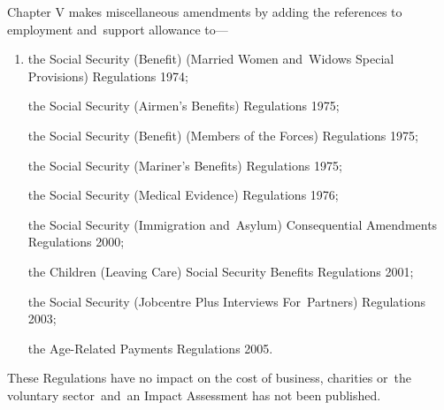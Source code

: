\documentclass[12pt,a4paper]{article}
\begin{document}
Chapter V makes miscellaneous amendments by adding the references to employment and~support allowance to—
\begin{enumerate}\item[]
    the Social Security (Benefit) (Married Women and~Widows Special Provisions) Regulations 1974;

    the Social Security (Airmen’s Benefits) Regulations 1975;

    the Social Security (Benefit) (Members of the Forces) Regulations 1975;

    the Social Security (Mariner’s Benefits) Regulations 1975;

    the Social Security (Medical Evidence) Regulations 1976;

    the Social Security (Immigration and~Asylum) Consequential Amendments Regulations 2000;

    the Children (Leaving Care) Social Security Benefits Regulations 2001;

    the Social Security (Jobcentre Plus Interviews For~Partners) Regulations 2003;

    the Age-Related Payments Regulations 2005. 
\end{enumerate}

These Regulations have no impact on the cost of business, charities or~the voluntary sector~and~an Impact Assessment has not been published. 
\end{document}
